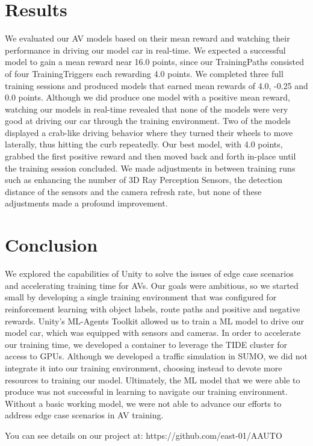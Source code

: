 \documentclass[conference]{IEEEtran}
\begin{document}
\section{Results}
We evaluated our AV models based on their mean reward and watching their performance in driving our model car in real-time.
We expected a successful model to gain a mean reward near 16.0 points, since our TrainingPaths consisted of four TrainingTriggers each rewarding 4.0 points.
We completed three full training sessions and produced models that earned mean rewards of 4.0, -0.25 and 0.0 points.
Although we did produce one model with a positive mean reward, watching our models in real-time revealed that none of the models were very good at driving our car through the training environment.
Two of the models displayed a crab-like driving behavior where they turned their wheels to move laterally, thus hitting the curb repeatedly.
Our best model, with 4.0 points, grabbed the first positive reward and then moved back and forth in-place until the training session concluded.
We made adjustments in between training runs such as enhancing the number of 3D Ray Perception Sensors, the detection distance of the sensors and the camera refresh rate, but none of these adjustments made a profound improvement.

\section{Conclusion}
We explored the capabilities of Unity to solve the issues of edge case scenarios and accelerating training time for AVs.
Our goals were ambitious, so we started small by developing a single training environment that was configured for reinforcement learning with object labels, route paths and positive and negative rewards.
Unity's ML-Agents Toolkit allowed us to train a ML model to drive our model car, which was equipped with sensors and cameras.
In order to accelerate our training time, we developed a container to leverage the TIDE cluster for access to GPUs.
Although we developed a traffic simulation in SUMO, we did not integrate it into our training environment, choosing instead to devote more resources to training our model.
Ultimately, the ML model that we were able to produce was not successful in learning to navigate our training environment.
Without a basic working model, we were not able to advance our efforts to address edge case scenarios in AV training.

\par
You can see details on our project at: https://github.com/east-01/AAUTO
\end{document}

